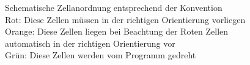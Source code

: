 \documentclass{article}
\begin{document}
\begin{figure}
\begin{tikzpicture}[scale= 1.5]
\end{tikzpicture}
\captionsetup{singlelinecheck=off}
\caption{Schematische Zellanordnung entsprechend der Konvention\\
Rot: Diese Zellen müssen in der richtigen Orientierung vorliegen\\
Orange: Diese Zellen liegen bei Beachtung der Roten Zellen automatisch in der richtigen Orientierung vor\\
 Grün: Diese Zellen werden vom Programm gedreht}
\label{figure:aufbau_farb}
\end{figure}

\nocite{*}
\printbibliography{}
\end{document}
